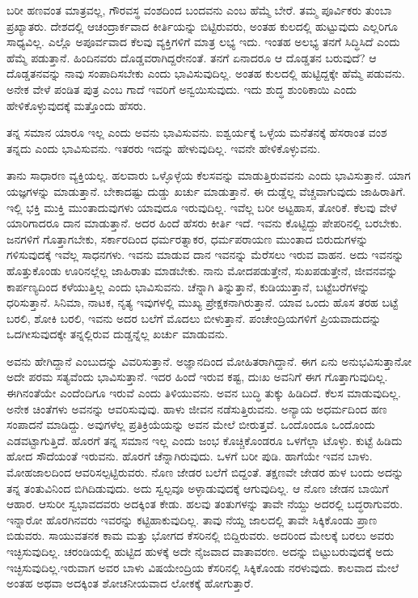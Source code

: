 ಬರೀ ಹಣವಂತ ಮಾತ್ರವಲ್ಲ, ಗೌರವಸ್ಥ ವಂಶದಿಂದ ಬಂದವನು ಎಂಬ ಹೆಮ್ಮೆ ಬೇರೆ. ತಮ್ಮ ಪೂರ್ವಿಕರು ತುಂಬಾ ಪ್ರಖ್ಯಾತರು. ದೇಶದಲ್ಲಿ ಆಚಂದ್ರಾರ್ಕವಾದ ಕೀರ್ತಿಯನ್ನು ಬಿಟ್ಟಿರುವರು, ಅಂತಹ ಕುಲದಲ್ಲಿ ಹುಟ್ಟುವುದು ಎಲ್ಲರಿಗೂ ಸಾಧ್ಯವಿಲ್ಲ. ಎಲ್ಲೊ ಅಪೂರ್ವವಾದ ಕೆಲವು ವ್ಯಕ್ತಿಗಳಿಗೆ ಮಾತ್ರ ಲಭ್ಯ ಇದು. ಇಂತಹ ಅಲಭ್ಯ ತನಗೆ ಸಿದ್ಧಿಸಿದೆ ಎಂದು ಹೆಮ್ಮೆ ಪಡುತ್ತಾನೆ. ಹಿಂದಿನವರು ದೊಡ್ಡವರಾಗಿದ್ದರೇನಂತೆ. ತನಗೆ ಏನಾದರೂ ಆ ದೊಡ್ಡತನ ಬರುವುದೆ? ಆ ದೊಡ್ಡತನವನ್ನು ನಾವು ಸಂಪಾದಿಸಬೇಕು ಎಂದು ಭಾವಿಸುವುದಿಲ್ಲ. ಅಂತಹ ಕುಲದಲ್ಲಿ ಹುಟ್ಟಿದ್ದಕ್ಕೇ ಹೆಮ್ಮೆ ಪಡುವನು. ಅನೇಕ ವೇಳೆ ಪಂಡಿತ ಪುತ್ರ ಎಂಬ ಗಾದೆ ಇವರಿಗೆ ಅನ್ವಯಿಸುವುದು. ಇದು ಶುದ್ಧ ಶುಂಠಿಕಾಯಿ ಎಂದು ಹೇಳಿಕೊಳ್ಳುವುದಕ್ಕೆ ಮತ್ತೊಂದು ಹೆಸರು.

ತನ್ನ ಸಮಾನ ಯಾರೂ ಇಲ್ಲ ಎಂದು ಅವನು ಭಾವಿಸುವನು. ಐಶ್ವರ್ಯಕ್ಕೆ ಒಳ್ಳೆಯ ಮನೆತನಕ್ಕೆ ಹೆಸರಾಂತ ವಂಶ ತನ್ನದು ಎಂದು ಭಾವಿಸುವನು. ಇತರರು ಇದನ್ನು ಹೇಳುವುದಿಲ್ಲ. ಇವನೇ ಹೇಳಿಕೊಳ್ಳುವನು.

ತಾನು ಸಾಧಾರಣ ವ್ಯಕ್ತಿಯಲ್ಲ. ಹಲವಾರು ಒಳ್ಳೊಳ್ಳೆಯ ಕೆಲಸವನ್ನು ಮಾಡುತ್ತಿರುವವನು ಎಂದು ಭಾವಿಸುತ್ತಾನೆ. ಯಾಗ ಯಜ್ಞಗಳನ್ನು ಮಾಡುತ್ತಾನೆ. ಬೇಕಾದಷ್ಟು ದುಡ್ಡು ಖರ್ಚು ಮಾಡುತ್ತಾನೆ. ಈ ದುಡ್ಡೆಲ್ಲ ವೆಚ್ಚವಾಗುವುದು ಜಾಹಿರಾತಿಗೆ. ಇಲ್ಲಿ ಭಕ್ತಿ ಮುಕ್ತಿ ಮುಂತಾದುವುಗಳು ಯಾವುದೂ ಇರುವುದಿಲ್ಲ. ಇವೆಲ್ಲ ಬರೀ ಅಟ್ಟಹಾಸ, ತೋರಿಕೆ. ಕೆಲವು ವೇಳೆ ಯಾರಿಗಾದರೂ ದಾನ ಮಾಡುತ್ತಾನೆ. ಅದರ ಹಿಂದೆ ಹೆಸರು ಕೀರ್ತಿ ಇದೆ. ಇವನು ಕೊಟ್ಟಿದ್ದು ಪೇಪರಿನಲ್ಲಿ ಬರಬೇಕು. ಜನಗಳಿಗೆ ಗೊತ್ತಾಗಬೇಕು, ಸರ್ಕಾರದಿಂದ ಧರ್ಮರತ್ನಾಕರ, ಧರ್ಮಪರಾಯಣ ಮುಂತಾದ ಬಿರುದುಗಳನ್ನು ಗಳಿಸುವುದಕ್ಕೆ ಇವೆಲ್ಲ ಸಾಧನಗಳು. ಇವನು ಮಾಡುವ ದಾನ ಇವನನ್ನು ಮೆರೆಸಲು ಇರುವ ವಾಹನ. ಅದು ಇವನನ್ನು ಹೊತ್ತುಕೊಂಡು ಊರಿನಲ್ಲೆಲ್ಲ ಜಾಹಿರಾತು ಮಾಡಬೇಕು. ನಾನು ಮೋದಪಡುತ್ತೇನೆ, ಸುಖಪಡುತ್ತೇನೆ, ಜೀವನವನ್ನು ಕಾರ್ಪಣ್ಯದಿಂದ ಕಳೆಯುತ್ತಿಲ್ಲ ಎಂದು ಭಾವಿಸುವನು. ಚೆನ್ನಾಗಿ ತಿನ್ನುತ್ತಾನೆ, ಕುಡಿಯುತ್ತಾನೆ, ಬಟ್ಟೆಬರೆಗಳನ್ನು ಧರಿಸುತ್ತಾನೆ. ಸಿನಿಮಾ, ನಾಟಕ, ನೃತ್ಯ ಇವುಗಳಲ್ಲಿ ಮುಖ್ಯ ಪ್ರೇಕ್ಷಕನಾಗಿರುತ್ತಾನೆ. ಯಾವ ಒಂದು ಹೊಸ ತರಹ ಬಟ್ಟೆ ಬರಲಿ, ಶೋಕಿ ಬರಲಿ, ಇವನು ಅದರ ಬಲೆಗೆ ಮೊದಲು ಬೀಳುತ್ತಾನೆ. ಪಂಚೇಂದ್ರಿಯಗಳಿಗೆ ಪ್ರಿಯವಾದುದನ್ನು ಒದಗೀಸುವುದಕ್ಕೇ ತನ್ನಲ್ಲಿರುವ ದುಡ್ಡನ್ನೆಲ್ಲ ಖರ್ಚು ಮಾಡುವನು.

ಅವನು ಹೇಗಿದ್ದಾನೆ ಎಂಬುದನ್ನು ವಿವರಿಸುತ್ತಾನೆ. ಅಜ್ಞಾನದಿಂದ ಮೋಹಿತರಾಗಿದ್ದಾನೆ. ಈಗ ಏನು ಅನುಭವಿಸುತ್ತಾನೋ ಅದೇ ಪರಮ ಸತ್ಯವೆಂದು ಭಾವಿಸುತ್ತಾನೆ. ಇದರ ಹಿಂದೆ ಇರುವ ಕಷ್ಟ, ದುಃಖ ಅವನಿಗೆ ಈಗ ಗೊತ್ತಾಗುವುದಿಲ್ಲ. ಈಗಿನಂತೆಯೇ ಎಂದೆಂದಿಗೂ ಇರುವೆ ಎಂದು ತಿಳಿಯುವನು. ಅವನ ಬುದ್ಧಿ ತುಕ್ಕು ಹಿಡಿದಿದೆ. ಕೆಲಸ ಮಾಡುವುದಿಲ್ಲ. ಅನೇಕ ಚಿಂತೆಗಳು ಅವನನ್ನು ಆವರಿಸುವುವು. ಹಾಳು ಜೀವನ ನಡೆಸುತ್ತಿರುವನು. ಅನ್ಯಾಯ ಅಧರ್ಮದಿಂದ ಹಣ ಸಂಪಾದನೆ ಮಾಡಿದ್ದು. ಅವುಗಳೆಲ್ಲ ಪ್ರತಿಕ್ರಿಯೆಯನ್ನು ಅವನ ಮೇಲೆ ಬೀರುತ್ತವೆ. ಒಂದೊಂದೂ ಒಂದೊಂದು ಎಡವಟ್ಟಾಗುತ್ತಿದೆ. ಹೊರಗೆ ತನ್ನ ಸಮಾನ ಇಲ್ಲ ಎಂದು ಜಂಭ ಕೊಚ್ಚಿಕೊಂಡರೂ ಒಳಗೆಲ್ಲಾ ಟೊಳ್ಳು. ಕುಟ್ಟೆ ಹಿಡಿದು ಹೋದ ಸೌದೆಯಂತೆ ಇರುವನು. ಹೊರಗೆ ಚೆನ್ನಾಗಿರುವುದು. ಒಳಗೆ ಬರೀ ಪುಡಿ. ಹಾಗೆಯೇ ಇವನ ಬಾಳು. ಮೋಹಜಾಲದಿಂದ ಆವರಿಸಲ್ಪಟ್ಟಿರುವರು. ನೊಣ ಜೇಡರ ಬಲೆಗೆ ಬಿದ್ದಂತೆ. ತಕ್ಷಣವೇ ಜೇಡರ ಹುಳ ಬಂದು ಅದನ್ನು ತನ್ನ ತಂತುವಿನಿಂದ ಬಿಗಿದಿಡುವುದು. ಅದು ಸ್ವಲ್ಪವೂ ಅಳ್ಳಾಡುವುದಕ್ಕೆ ಆಗುವುದಿಲ್ಲ. ಆ ನೊಣ ಜೇಡನ ಬಾಯಿಗೆ ಆಹಾರ. ಆಸುರೀ ಸ್ವಭಾವದವರು ಅದಕ್ಕಿಂತ ಕೇಡು. ಹಲವು ತಂತುಗಳನ್ನು ತಾವೇ ನೆಯ್ದು ಅದರಲ್ಲಿ ಬದ್ಧರಾಗುವರು. ಇನ್ನಾರೋ ಹೊರಗಿನವರು ಇವರನ್ನು ಕಟ್ಟಿಹಾಕುವುದಿಲ್ಲ. ತಾವು ನೆಯ್ದ ಜಾಲದಲ್ಲಿ ತಾವೇ ಸಿಕ್ಕಿಕೊಂಡು ಪ್ರಾಣ ಬಿಡುವರು. ಸಾಯುವತನಕ ಕಾಮ ಮತ್ತು ಭೋಗದ ಕೆಸರಿನಲ್ಲಿ ಬಿದ್ದಿರುವರು. ಅದರಿಂದ ಮೇಲಕ್ಕೆ ಬರಲು ಅವರು ಇಚ್ಛಿಸುವುದಿಲ್ಲ. ಚರಂಡಿಯಲ್ಲಿ ಹುಟ್ಟಿದ ಹುಳಕ್ಕೆ ಅದೇ ನೈಜವಾದ ವಾತಾವರಣ. ಅದನ್ನು ಬಿಟ್ಟುಬರುವುದಕ್ಕೆ ಅದು ಇಚ್ಛಿಸುವುದಿಲ್ಲ.\break ಇರುವಾಗ ಅವರ ಬಾಳು ವಿಷಯೇಂದ್ರಿಯ ಕೆಸರಿನಲ್ಲಿ ಸಿಕ್ಕಿಕೊಂಡು ನರಳುವುದು. ಕಾಲವಾದ ಮೇಲೆ ಅಂತಹ ಅಥವಾ ಅದಕ್ಕಿಂತ ಶೋಚನೀಯವಾದ ಲೋಕಕ್ಕೆ ಹೋಗುತ್ತಾರೆ.

